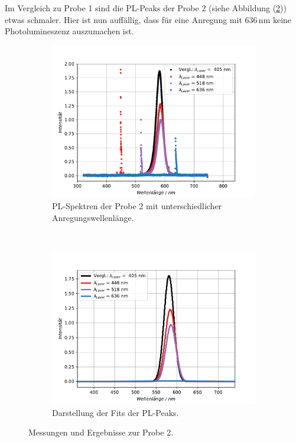 Im Vergleich zu Probe 1 sind die PL-Peaks der Probe 2 (siehe Abbildung (\ref{abb:auf2p2b})) etwas schmaler.
Hier ist nun auff\"{a}llig, dass f\"{u}r eine Anregung mit $636 \, \text{nm}$ keine Photolumineszenz auszumachen ist.
\begin{figure}[hbtp]
\centering
	\begin{subfigure}[t]{0.45\textwidth}
	\includegraphics[width=\textwidth]{Plots/aufgabe2P2.pdf}
	\caption{PL-Spektren der Probe 2 mit unterschiedlicher Anregungswellenl\"{a}nge.}
	\label{abb:auf2p2a}
	\end{subfigure}
	~
	\begin{subfigure}[t]{0.45\textwidth}
	\includegraphics[width=\textwidth]{Plots/aufgabe2P2_fit_1s.pdf}
	\caption{Darstellung der Fits der PL-Peaks.}
	\label{abb:auf2p2b}
	\end{subfigure}
\caption{Messungen und Ergebnisse zur Probe 2.}
\label{abb:auf2P2}
\end{figure}
